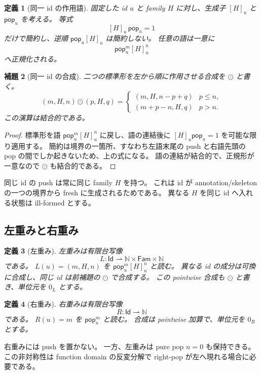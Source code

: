 \documentclass[uplatex,dvipdfmx,a4paper,10.5pt]{jsarticle}
\theoremstyle{jpplain}
\newtheorem{definition}{定義}[section]
\newtheorem{lemma}[definition]{補題}
\newcommand{\Fam}{\mathsf{Fam}}
\newcommand{\Id}{\mathsf{Id}}
\newcommand{\Nat}{\mathbb N}
\newcommand{\takeop}[2]{[#1]_{#2}}
\newcommand{\popop}[1]{\mathsf{pop}_{#1}}
\begin{document}
\begin{definition}[同一 id の作用語]
固定した id $u$ と family $H$ に対し、生成子 $\takeop{H}{u}$ と $\popop{u}$ を考える。
等式
\[
  \takeop{H}{u}\,\popop{u}=1
\]
だけで簡約し、逆順 $\popop{u}\takeop{H}{u}$ は簡約しない。
任意の語は一意に
\[
  \popop{u}^{m}\takeop{H}{u}^{n}
\]
へ正規化される。
\end{definition}

\begin{lemma}[同一 id の合成]
二つの標準形を左から順に作用させる合成を $\odot$ と書く。
\[
(m,H,n)\odot(p,H,q)=
\begin{cases}
(m,H,n-p+q) & p\le n,\\
(m+p-n,H,q) & p>n.
\end{cases}
\]
この演算は結合的である。
\end{lemma}

\begin{proof}
標準形を語 $\popop{u}^{m}\takeop{H}{u}^{n}$ に戻し、語の連結後に
$\takeop{H}{u}\popop{u}=1$ を可能な限り適用する。
簡約は境界の一箇所、すなわち左語末尾の push と右語先頭の pop の間でしか起きないため、上の式になる。
語の連結が結合的で、正規形が一意なので $\odot$ も結合的である。
\end{proof}

同じ id の push は常に同じ family $H$ を持つ。
これは id が annotation/skeleton の一つの境界から fresh に生成されるためである。
異なる $H$ を同じ id へ入れる状態は ill-formed とする。

\subsection{左重みと右重み}

\begin{definition}[左重み]
左重みは有限台写像
\[
  L:\Id\rightharpoonup \Nat\times\Fam\times\Nat
\]
である。
$L(u)=(m,H,n)$ を $\popop{u}^{m}\takeop{H}{u}^{n}$ と読む。
異なる id の成分は可換に合成し、同じ id は前補題の $\odot$ で合成する。
この pointwise 合成も $\odot$ と書き、単位元を $0_L$ とする。
\end{definition}

\begin{definition}[右重み]
右重みは有限台写像
\[
  R:\Id\rightharpoonup\Nat
\]
である。
$R(u)=m$ を $\popop{u}^{m}$ と読む。
合成は pointwise 加算で、単位元を $0_R$ とする。
\end{definition}

右重みには push を置かない。
一方、左重みは pure pop $n=0$ も保持できる。
この非対称性は function domain の反変分解で right-pop が左へ現れる場合に必要である。
\end{document}
